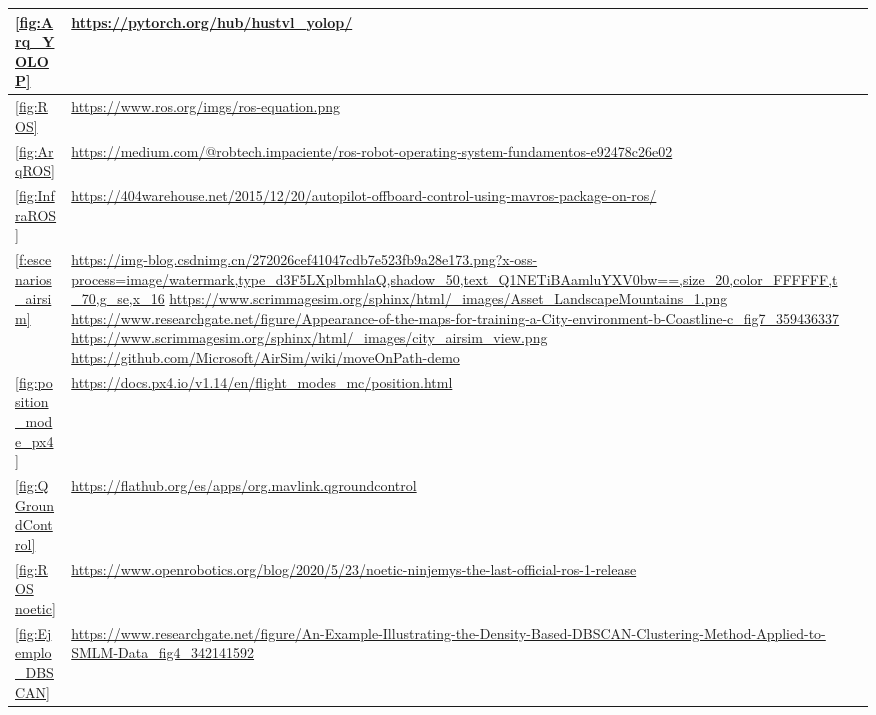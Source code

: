\begin{tabular}{ | m{4cm} | m{10cm}| m{1cm} | }

    \hline
    \ref{fig:Arq_YOLOP} & \url{https://pytorch.org/hub/hustvl_yolop/} \\
    \hline
    \ref{fig:ROS} & \url{https://www.ros.org/imgs/ros-equation.png} \\
    \hline
    \ref{fig:ArqROS} & \url{https://medium.com/@robtech.impaciente/ros-robot-operating-system-fundamentos-e92478c26e02} \\
    \hline
    \ref{fig:InfraROS} & \url{https://404warehouse.net/2015/12/20/autopilot-offboard-control-using-mavros-package-on-ros/} \\
    \hline
    \ref{f:escenarios_airsim} & \url{https://img-blog.csdnimg.cn/272026cef41047cdb7e523fb9a28e173.png?x-oss-process=image/watermark,type_d3F5LXplbmhlaQ,shadow_50,text_Q1NETiBAamluYXV0bw==,size_20,color_FFFFFF,t_70,g_se,x_16} \newline
    \url{https://www.scrimmagesim.org/sphinx/html/_images/Asset_LandscapeMountains_1.png} \newline
    \url{https://www.researchgate.net/figure/Appearance-of-the-maps-for-training-a-City-environment-b-Coastline-c_fig7_359436337} \newline
    \url{https://www.scrimmagesim.org/sphinx/html/_images/city_airsim_view.png} \newline
    \url{https://github.com/Microsoft/AirSim/wiki/moveOnPath-demo} \\
    \hline
    \ref{fig:position_mode_px4} & \url{https://docs.px4.io/v1.14/en/flight_modes_mc/position.html} \\
    \hline
    \ref{fig:QGroundControl} & \url{https://flathub.org/es/apps/org.mavlink.qgroundcontrol} \\
    \hline
    \ref{fig:ROS noetic} & \url{https://www.openrobotics.org/blog/2020/5/23/noetic-ninjemys-the-last-official-ros-1-release} \\
    \hline
    \ref{fig:Ejemplo_DBSCAN} & \url{https://www.researchgate.net/figure/An-Example-Illustrating-the-Density-Based-DBSCAN-Clustering-Method-Applied-to-SMLM-Data_fig4_342141592} \\
    \hline



\end{tabular}




